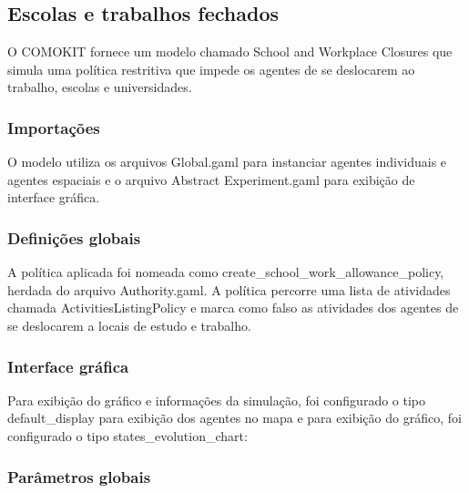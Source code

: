 \subsection{Escolas e trabalhos fechados}

O COMOKIT fornece um modelo chamado School and Workplace Closures que simula uma política restritiva que impede os agentes de se deslocarem ao trabalho, escolas e universidades.


\subsubsection{Importações}

O modelo utiliza os arquivos Global.gaml para instanciar agentes individuais e agentes espaciais e o arquivo Abstract Experiment.gaml para exibição de interface gráfica.

\subsubsection{Definições globais}

A política aplicada foi nomeada como create\_school\_work\_allowance\_policy, herdada do arquivo Authority.gaml. A política percorre uma lista de atividades chamada ActivitiesListingPolicy e marca como falso as atividades dos agentes de se deslocarem a locais de estudo e trabalho.



\subsubsection{Interface gráfica}

Para exibição do gráfico e informações da simulação, foi configurado o tipo default\_display para exibição dos agentes no mapa e para exibição do gráfico, foi configurado o tipo states\_evolution\_chart:



\subsubsection{Parâmetros globais}

